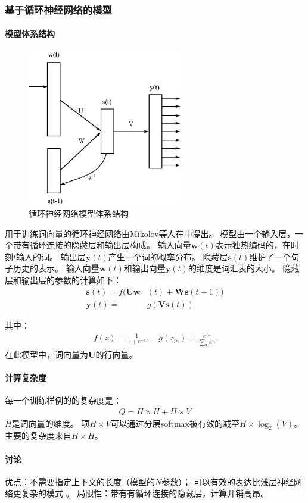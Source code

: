 \subsubsection{基于循环神经网络的模型}

\paragraph{模型体系结构}
\begin{figure}
  \includegraphics[width=0.6\textwidth]{figures/rnn-rvecs.eps}
  \centering
  \caption{循环神经网络模型体系结构\cite{DBLP:conf/interspeech/MikolovKBCK10}}
  \label{fig:rnn-arch}
\end{figure}

用于训练词向量的循环神经网络由Mikolov等人在\cite{DBLP:conf/interspeech/MikolovKBCK10}中提出。
模型由一个输入层，一个带有循环连接的隐藏层和输出层构成。
输入向量$\mathbf{w}(t)$表示独热编码的，在时刻$t$输入的词。
输出层$\mathbf{y}(t)$产生一个词的概率分布。
隐藏层$\mathbf{s}(t)$维护了一个句子历史的表示。
输入向量$\mathbf{w}(t)$和输出向量$\mathbf{y}(t)$的维度是词汇表的大小。
隐藏层和输出层的参数的计算如下：
\begin{align}
  \mathbf{s}(t) = f(\mathbf{Uw} & (t) + \mathbf{Ws}(t-1)) \\
  \mathbf{y}(t) = & g(\mathbf{Vs}(t))
  \label{eqn:rnn-arch}
\end{align}

其中：
\begin{align}
  f(z) = \frac{1}{1+e^{-z}}, \quad g(z_m) = \frac{e^{z_m}}{\sum_k e^{z_k}}
\end{align}
在此模型中，词向量为$\mathbf{U}$的行向量。

\paragraph{计算复杂度}
每一个训练样例的的复杂度是：
\begin{align}
  Q = H \times H + H \times V
  \label{eqn:rnn-complexity}
\end{align}
$H$是词向量的维度。
项$H \times V$可以通过分层softmax被有效的减至$H \times \log_2(V)$。
主要的复杂度来自$H \times H$。

\paragraph{讨论}
优点：不需要指定上下文的长度（模型的$N$参数）； 可以有效的表达比浅层神经网络更复杂的模式
\cite{DBLP:conf/interspeech/MikolovKBCK10}
\cite{40d5d7fd62cb44ba934a8a75d4b2b076}。
局限性：带有有循环连接的隐藏层，计算开销高昂。
